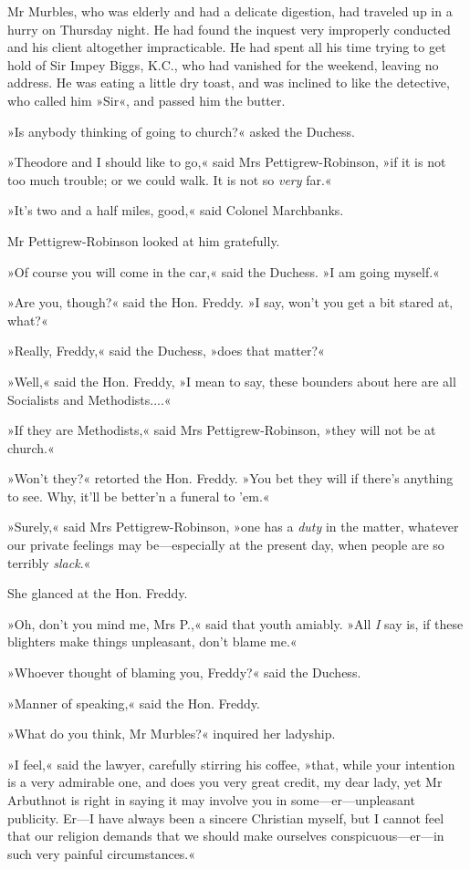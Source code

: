 Mr Murbles, who was elderly and had a delicate digestion, had traveled up in a hurry on Thursday night. He had found the inquest very improperly conducted and his client altogether impracticable. He had spent all his time trying to get hold of Sir Impey Biggs, K.C., who had vanished for the weekend, leaving no address. He was eating a little dry toast, and was inclined to like the detective, who called him »Sir«, and passed him the butter.

»Is anybody thinking of going to church?« asked the Duchess.

»Theodore and I should like to go,« said Mrs Pettigrew-Robinson, »if it is not too much trouble; or we could walk. It is not so \textit{very} far.«

»It's two and a half miles, good,« said Colonel Marchbanks.

Mr Pettigrew-Robinson looked at him gratefully.

»Of course you will come in the car,« said the Duchess. »I am going myself.«

»Are you, though?« said the Hon. Freddy. »I say, won't you get a bit stared at, what?«

»Really, Freddy,« said the Duchess, »does that matter?«

»Well,« said the Hon. Freddy, »I mean to say, these bounders about here are all Socialists and Methodists....«

»If they are Methodists,« said Mrs Pettigrew-Robinson, »they will not be at church.«

»Won't they?« retorted the Hon. Freddy. »You bet they will if there's anything to see. Why, it'll be better'n a funeral to 'em.«

»Surely,« said Mrs Pettigrew-Robinson, »one has a \textit{duty} in the matter, whatever our private feelings may be\allowbreak---\allowbreak especially at the present day, when people are so terribly \textit{slack}.«

She glanced at the Hon. Freddy.

»Oh, don't you mind me, Mrs P.,« said that youth amiably. »All \textit{I} say is, if these blighters make things unpleasant, don't blame me.«

»Whoever thought of blaming you, Freddy?« said the Duchess.

»Manner of speaking,« said the Hon. Freddy.

»What do you think, Mr Murbles?« inquired her ladyship.

»I feel,« said the lawyer, carefully stirring his coffee, »that, while your intention is a very admirable one, and does you very great credit, my dear lady, yet Mr Arbuthnot is right in saying it may involve you in some\allowbreak---\allowbreak er---unpleasant publicity. Er\allowbreak---\allowbreak I have always been a sincere Christian myself, but I cannot feel that our religion demands that we should make ourselves conspicuous\allowbreak---\allowbreak er---in such very painful circumstances.«

